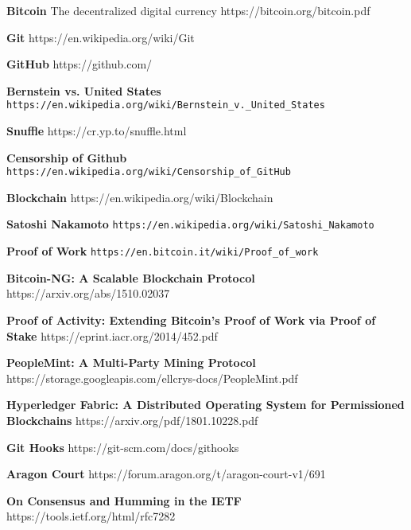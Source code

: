 \newpage
\begin{thebibliography}{999}
	\textbf{Bitcoin} The decentralized digital currency
	https://bitcoin.org/bitcoin.pdf
	
	\textbf{Git}
	https://en.wikipedia.org/wiki/Git
	
	\textbf{GitHub}
	https://github.com/
	
	\textbf{Bernstein vs. United States}
	\verb|https://en.wikipedia.org/wiki/Bernstein_v._United_States|
	
	\textbf{Snuffle}
	https://cr.yp.to/snuffle.html
	
	\textbf{Censorship of Github}
	\verb|https://en.wikipedia.org/wiki/Censorship_of_GitHub|
	
	\textbf{Blockchain}
	https://en.wikipedia.org/wiki/Blockchain
	
	\textbf{Satoshi Nakamoto}
	\verb|https://en.wikipedia.org/wiki/Satoshi_Nakamoto|
	
	\textbf{Proof of Work}
	\verb|https://en.bitcoin.it/wiki/Proof_of_work|
	
	\textbf{Bitcoin-NG: A Scalable Blockchain Protocol}
	https://arxiv.org/abs/1510.02037
	
	\textbf{Proof of Activity: Extending Bitcoin’s Proof of Work via Proof of Stake}
	https://eprint.iacr.org/2014/452.pdf
	
	\textbf{PeopleMint: A Multi-Party Mining Protocol}
	https://storage.googleapis.com/ellcrys-docs/PeopleMint.pdf
	
	\textbf{Hyperledger Fabric: A Distributed Operating System for Permissioned Blockchains}
	https://arxiv.org/pdf/1801.10228.pdf
	
	\textbf{Git Hooks}
	https://git-scm.com/docs/githooks
	
	\textbf{Aragon Court}
	https://forum.aragon.org/t/aragon-court-v1/691
	
	\textbf{On Consensus and Humming in the IETF}
	https://tools.ietf.org/html/rfc7282
\end{thebibliography}